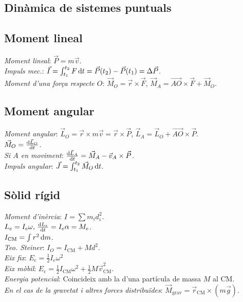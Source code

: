 \documentclass[10pt]{article}
\newcommand{\lp}{\left(}
\newcommand{\rp}{\right)}
\newcommand{\ci}{\textbullet\;}
\begin{document}
\begin{multicols}{4}
\section{Din\`amica de sistemes puntuals}

\subsection{Moment lineal}
\emph{Moment lineal}: $\vec{P} = m\vec{v}$. \\
\emph{Impuls mec.}: $\vec{I} = \int_{t_1}^{t_2} F \dif t = \vec{P}(t_2) - \vec{P}(t_1) = \Delta\vec{P}$. \\
\emph{Moment d'una força respecte $O$}: $\vec{M}_O = \vec{r}\times\vec{F}$, $\vec{M}_A = \vec{AO}\times\vec{F} + \vec{M}_O$.

\subsection{Moment angular}
\emph{Moment angular}: $\vec{L}_O = \vec{r}\times m\vec{v} = \vec{r}\times\vec{P}$, $\vec{L}_A = \vec{L}_O + \vec{AO}\times\vec{P}$. \\
\ci $\vec{M}_O = \frac{\dif \vec{L}_O}{\dif t}$. \\
\emph{Si $A$ en moviment}: $\frac{\dif \vec{L}_A}{\dif t} = \vec{M}_A - \vec{v}_A\times\vec{P}$.\\
\emph{Impuls angular}: $\vec{J} = \int_{t_1}^{t_2} \vec{M}_O\dif t$.

\subsection{Sòlid rígid}
\emph{Moment d'inèrcia}: $I = \sum m_i d_i^2$. \\
\ci $L_e = I_e\omega,\, \frac{\dif L_e}{\dif t} = I_e\alpha = M_e$. \\
\ci $I_{\text{CM}} = \int r^2 \dif m$. \\
\emph{Teo. Steiner}: $I_O = I_{\text{CM}} + Md^2$. \\
\emph{Eix fix}: $E_\text{c} = \frac{1}{2} I_e \omega^2 $\\
\emph{Eix mòbil}: $E_{\text{c}} = \frac{1}{2} I_\text{CM}\omega^2 + \frac{1}{2}  M\vec{v}_{\text{CM}}^2$.\\
\emph{Energia potencial}: Coincideix amb la d'una partícula de massa $M$ al CM.\\
\emph{En el cas de la gravetat i altres forces distribuïdes}: $\vec{M}_\text{grav}
  = \vec{r}_\text{CM} \times \lp m \vec{g} \rp$.


\end{multicols}
\end{document}
